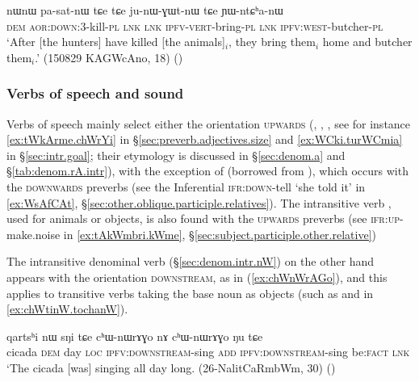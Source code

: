 \begin{exe}
\ex \label{ex:YWtChanW}
\gll nɯnɯ pa-sat-nɯ tɕe tɕe ju-nɯ-ɣɯt-nɯ tɕe ɲɯ-ntɕʰa-nɯ  \\
\textsc{dem} \textsc{aor}:\textsc{down}:3\flobv{}-kill-\textsc{pl} \textsc{lnk} \textsc{lnk} \textsc{ipfv}-\textsc{vert}-bring-\textsc{pl} \textsc{lnk} \textsc{ipfv}:\textsc{west}-butcher-\textsc{pl} \\
\glt `After [the hunters] have killed [the animals]$_i$, they bring them$_i$ home and butcher them$_i$.' (150829 KAGWcAno, 18) ()
\end{exe} 

\subsubsection{Verbs of speech and sound}  \label{sec:preverb.speech}
Verbs of speech mainly select either the orientation \textsc{upwards} (, , , see for instance \ref{ex:tWkArme.chWrYi} in §\ref{sec:preverb.adjectives.size} and \ref{ex:WCki.turWCmia} in §\ref{sec:intr.goal}; their etymology is discussed in §\ref{sec:denom.a} and §\ref{tab:denom.rA.intr}), with the exception of  (borrowed from ), which occurs with the \textsc{downwards} preverbs (see the Inferential  \textsc{ifr}:\textsc{down}-tell `she told it' in \ref{ex:WsAfCAt}, §\ref{sec:other.oblique.participle.relatives}). The intransitive verb , used for animals or objects, is also found with the \textsc{upwards} preverbs (see  \textsc{ifr}:\textsc{up}-make.noise in \ref{ex:tAkWmbri.kWme}, §\ref{sec:subject.participle.other.relative})

The intransitive denominal verb  (§\ref{sec:denom.intr.nW}) on the other hand appears with the orientation \textsc{downstream}, as in (\ref{ex:chWnWrAGo}), and this applies to transitive verbs taking the base noun  as objects (such as  and   in \ref{ex:chWtinW.tochanW}).

\begin{exe}
\ex \label{ex:chWnWrAGo}
\gll qartsʰi nɯ sŋi tɕe cʰɯ-nɯrɤɣo nɤ cʰɯ-nɯrɤɣo ŋu tɕe   \\
cicada \textsc{dem} day \textsc{loc} \textsc{ipfv}:\textsc{downstream}-sing \textsc{add} \textsc{ipfv}:\textsc{downstream}-sing be:\textsc{fact} \textsc{lnk} \\
\glt `The cicada [was] singing all day long. (26-NalitCaRmbWm, 30)
()
\end{exe} 


